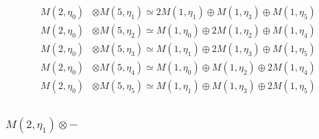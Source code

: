 \begin{align*}
M(2,\eta_{0}) &\otimes M(5,\eta_{1}) \simeq 2 M(1,\eta_{1}) \oplus M(1,\eta_{3}) \oplus M(1,\eta_{5}) \\
M(2,\eta_{0}) &\otimes M(5,\eta_{2}) \simeq M(1,\eta_{0}) \oplus 2 M(1,\eta_{2}) \oplus M(1,\eta_{4}) \\
M(2,\eta_{0}) &\otimes M(5,\eta_{3}) \simeq M(1,\eta_{1}) \oplus 2 M(1,\eta_{3}) \oplus M(1,\eta_{5}) \\
M(2,\eta_{0}) &\otimes M(5,\eta_{4}) \simeq M(1,\eta_{0}) \oplus M(1,\eta_{2}) \oplus 2 M(1,\eta_{4}) \\
M(2,\eta_{0}) &\otimes M(5,\eta_{5}) \simeq M(1,\eta_{1}) \oplus M(1,\eta_{3}) \oplus 2 M(1,\eta_{5}) \\
\end{align*}

\subsubsection{$ M(2,\eta_{1})\otimes -$}
